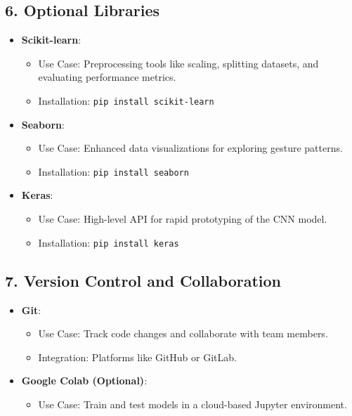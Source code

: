 \subsection{6. Optional Libraries}
\begin{itemize}
    \item \textbf{Scikit-learn}: 
    \begin{itemize}
        \item Use Case: Preprocessing tools like scaling, splitting datasets, and evaluating performance metrics.
        \item Installation: \texttt{pip install scikit-learn}
    \end{itemize}
    \item \textbf{Seaborn}: 
    \begin{itemize}
        \item Use Case: Enhanced data visualizations for exploring gesture patterns.
        \item Installation: \texttt{pip install seaborn}
    \end{itemize}
    \item \textbf{Keras}: 
    \begin{itemize}
        \item Use Case: High-level API for rapid prototyping of the CNN model.
        \item Installation: \texttt{pip install keras}
    \end{itemize}
\end{itemize}

\subsection{7. Version Control and Collaboration}
\begin{itemize}
    \item \textbf{Git}: 
    \begin{itemize}
        \item Use Case: Track code changes and collaborate with team members.
        \item Integration: Platforms like GitHub or GitLab.
    \end{itemize}
    \item \textbf{Google Colab (Optional)}: 
    \begin{itemize}
        \item Use Case: Train and test models in a cloud-based Jupyter environment.
    \end{itemize}
\end{itemize}

